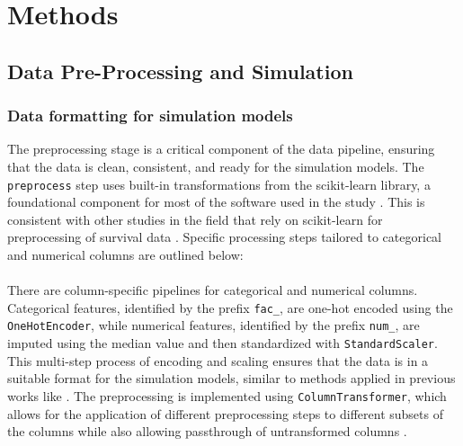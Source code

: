 \section{Methods} \label{methods}
\subsection{Data Pre-Processing and Simulation}
\subsubsection*{Data formatting for simulation models}

\noindent The preprocessing stage is a critical component of the data pipeline, ensuring that the data is clean, consistent, and ready for the simulation models. The \texttt{preprocess} step uses built-in transformations from the scikit-learn library, a foundational component for most of the software used in the study \parencite{scikit-learn}. This is consistent with other studies in the field that rely on scikit-learn for preprocessing of survival data \parencite{haider_effective_2018}. Specific processing steps tailored to categorical and numerical columns are outlined below:
\\\\
\noindent There are column-specific pipelines for categorical and numerical columns. Categorical features, identified by the prefix \texttt{fac\_}, are one-hot encoded using the \texttt{OneHotEncoder}, while numerical features, identified by the prefix \texttt{num\_}, are imputed using the median value and then standardized with \texttt{StandardScaler}. This multi-step process of encoding and scaling ensures that the data is in a suitable format for the simulation models, similar to methods applied in previous works like \parencite{freijeirogonzalez_critical_2022}. The preprocessing is implemented using \texttt{ColumnTransformer}, which allows for the application of different preprocessing steps to different subsets of the columns while also allowing passthrough of untransformed columns \parencite{pedregosa_etal_2011_scikit_learn}.

